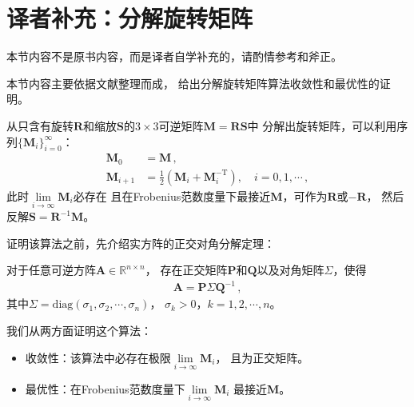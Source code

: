 \section{译者补充：分解旋转矩阵}\label{sec:译者补充：分解旋转矩阵}
\begin{remark}
    本节内容不是原书内容，而是译者自学补充的，请酌情参考和斧正。
\end{remark}

本节内容主要依据文献\citep{doi:10.1137/0907079,10.5555/155294.155324}整理而成，
给出分解旋转矩阵算法收敛性和最优性的证明。

从只含有旋转$\bm R$和缩放$\bm S$的$3\times3$可逆矩阵$\bm M=\bm R\bm S$中
分解出旋转矩阵，可以利用序列$\displaystyle\{\bm M_i\}_{i=0}^{\infty}$：
\begin{align}
    \bm M_0     & =\bm M\, ,                                                         \\
    \bm M_{i+1} & =\frac{1}{2}(\bm M_i+\bm M_i^{-\mathrm{T}}),\quad i=0,1,\cdots\, ,
\end{align}
此时$\displaystyle \lim\limits_{i \to \infty}{\bm M_i}$必存在
且在Frobenius范数度量下最接近$\bm M$，可作为$\bm R$或$-\bm R$，
然后反解$\bm S=\bm R^{-1}\bm M$。

证明该算法之前，先介绍实方阵的正交对角分解定理：
\begin{theorem}
    对于任意可逆方阵$\bm A\in\mathbb{R}^{n\times n}$，
    存在正交矩阵$\bm P$和$\bm Q$以及对角矩阵$\bm \varSigma$，使得
    \begin{align}
        \bm A=\bm P\bm \varSigma\bm Q^{-1}\, ,
    \end{align}
    其中$\bm \varSigma=\mathrm{diag}(\sigma_1,\sigma_2,\cdots,\sigma_n)$，
    $\sigma_k>0$，$k=1,2,\cdots,n$。
\end{theorem}

我们从两方面证明这个算法：
\begin{itemize}
    \item 收敛性：该算法中必存在极限$\displaystyle\lim\limits_{i\rightarrow\infty}\bm M_i$，
          且为正交矩阵。
    \item 最优性：在Frobenius范数度量下$\displaystyle\lim\limits_{i\rightarrow\infty}\bm M_i$
          最接近$\bm M$。
\end{itemize}

